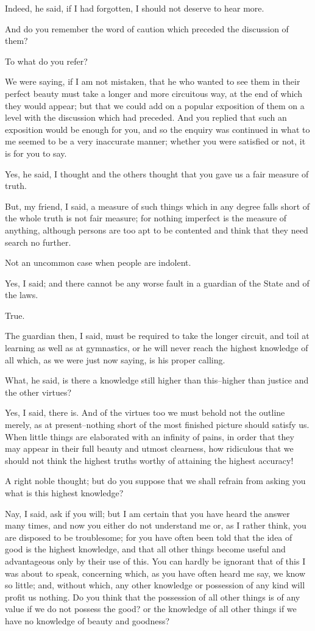 Indeed, he said, if I had forgotten, I should not deserve to hear more.

And do you remember the word of caution which preceded the discussion of
them?

To what do you refer?

We were saying, if I am not mistaken, that he who wanted to see them in
their perfect beauty must take a longer and more circuitous way, at
the end of which they would appear; but that we could add on a popular
exposition of them on a level with the discussion which had preceded.
And you replied that such an exposition would be enough for you, and so
the enquiry was continued in what to me seemed to be a very inaccurate
manner; whether you were satisfied or not, it is for you to say.

Yes, he said, I thought and the others thought that you gave us a fair
measure of truth.

But, my friend, I said, a measure of such things which in any degree
falls short of the whole truth is not fair measure; for nothing
imperfect is the measure of anything, although persons are too apt to be
contented and think that they need search no further.

Not an uncommon case when people are indolent.

Yes, I said; and there cannot be any worse fault in a guardian of the
State and of the laws.

True.

The guardian then, I said, must be required to take the longer circuit,
and toil at learning as well as at gymnastics, or he will never reach
the highest knowledge of all which, as we were just now saying, is his
proper calling.

What, he said, is there a knowledge still higher than this--higher than
justice and the other virtues?

Yes, I said, there is. And of the virtues too we must behold not the
outline merely, as at present--nothing short of the most finished
picture should satisfy us. When little things are elaborated with an
infinity of pains, in order that they may appear in their full beauty
and utmost clearness, how ridiculous that we should not think the
highest truths worthy of attaining the highest accuracy!

A right noble thought; but do you suppose that we shall refrain from
asking you what is this highest knowledge?

Nay, I said, ask if you will; but I am certain that you have heard the
answer many times, and now you either do not understand me or, as I
rather think, you are disposed to be troublesome; for you have often
been told that the idea of good is the highest knowledge, and that all
other things become useful and advantageous only by their use of this.
You can hardly be ignorant that of this I was about to speak, concerning
which, as you have often heard me say, we know so little; and, without
which, any other knowledge or possession of any kind will profit us
nothing. Do you think that the possession of all other things is of
any value if we do not possess the good? or the knowledge of all other
things if we have no knowledge of beauty and goodness?

